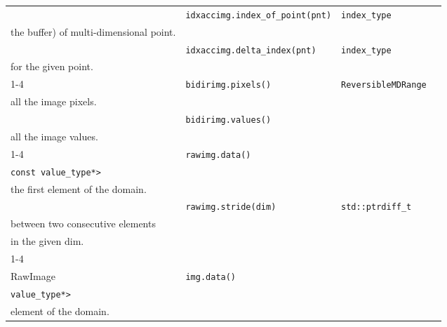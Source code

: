 \begin{table}[!htbp]
\begin{scriptsize}
\begin{tabular}{llll}
      \multicolumn{1}{c|}{}                                    & \texttt{idxaccimg.index\_of\_point(pnt)}    & \texttt{index\_type}                        & \makecell[l]{Get the linear index (offset in        \\ the buffer) of multi-dimensional point.} \\
      \multicolumn{1}{c|}{}                                    & \texttt{idxaccimg.delta\_index(pnt)}        & \texttt{index\_type}                        & \makecell[l]{Get the linear index offset            \\ for the given point.} \\
      \cline{1-4}
      \multicolumn{1}{c|}{\multirow{2}{*}{BidirectionalImage}} & \texttt{bidirimg.pixels()}                  & \multirow{2}{*}{\texttt{ReversibleMDRange}} & \makecell[l]{Return a reversible range that yields  \\ all the image pixels.} \\
      \multicolumn{1}{c|}{}                                    & \texttt{bidirimg.values()}                  &                                             & \makecell[l]{Return a reversible range that yields  \\ all the image values.} \\
      \cline{1-4}
      \multicolumn{1}{c|}{\multirow{2}{*}{RawImage}}           & \texttt{rawimg.data()}                      & \makecell[l]{\texttt{std::convertible\_to<}                                                       \\\texttt{const value\_type*>}} & \makecell[l]{Get a constant pointer to \\ the first element of the domain.} \\
      \multicolumn{1}{c|}{}                                    & \texttt{rawimg.stride(dim)}                 & \texttt{std::ptrdiff\_t}                    & \makecell[l]{Get the stride (in number of elements) \\ between two consecutive elements \\in the given dim.} \\
      \cline{1-4}
      \multicolumn{1}{c|}{\multirow{2}{*}{\makecell[l]{Writable                                                                                                                                                  \\RawImage}}}           & \texttt{img.data()}                         & \makecell[l]{\texttt{std::convertible\_to<}\\\texttt{value\_type*>}} & \makecell[l]{Get a pointer to the first\\ element of the domain.} \\

\end{tabular}
\end{scriptsize}
\end{table}
